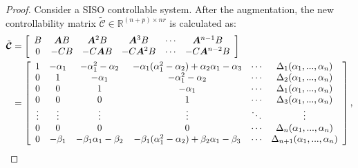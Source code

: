 \documentclass[a4paper,11pt]{book}
\numberwithin{figure}{chapter}
\numberwithin{equation}{chapter}
\numberwithin{table}{chapter}
\theoremstyle{definition}
\begin{document}
\begin{proof}
    Consider a SISO controllable system. After the augmentation, the new controllability matrix $\tilde{\bm{\mathcal{C}}} \in \mathbb{R}^{(n+p)\times nr}$ is calculated as:
    \begin{align}
    \begin{split}
        \tilde{\bm{\mathcal{C}}} &= \begin{bmatrix}
        \begin{array}{c c c c c c}
            B & \bm{A} B & \bm{A}^2 B & \bm{A}^3 B & \cdots & \bm{A}^{n-1} B \\ 
            0 & -C B & -C \bm{A} B & -C \bm{A}^2 B & \cdots & -C \bm{A}^{n-2} B
        \end{array}
        \end{bmatrix} \\
        &=
            \begin{bmatrix}
            \begin{array}{c c c c c c}
                1 & -\alpha_1 & -\alpha_1^2 - \alpha_2 & -\alpha_1(\alpha_1^2 - \alpha_2) + \alpha_2 \alpha_1 - \alpha_3 & \cdots & \Delta_1(\alpha_1,...,\alpha_n) \\
                0 & 1 & -\alpha_1 & -\alpha_1^2 - \alpha_2  & \cdots & \Delta_2(\alpha_1,...,\alpha_n) \\
                0 & 0 & 1 & -\alpha_1  & \cdots & \Delta_1(\alpha_1,...,\alpha_n) \\
                0 & 0 & 0 & 1 &  \cdots & \Delta_3(\alpha_1,...,\alpha_n) \\
                \vdots & \vdots & \vdots & \vdots & \ddots & \vdots \\
                0 & 0 & 0 & 0 & \cdots & \Delta_{n}(\alpha_1,...,\alpha_n) \\
                0 & -\beta_1 & -\beta_1 \alpha_1 - \beta_2 & -\beta_1(\alpha_1^2 - \alpha_2) + \beta_2 \alpha_1 - \beta_3  & \cdots & \Delta_{n+1}(\alpha_1,...,\alpha_n)
            \end{array}
            \end{bmatrix},
    \end{split}
    \end{align}
    

\end{proof}
\end{document}
